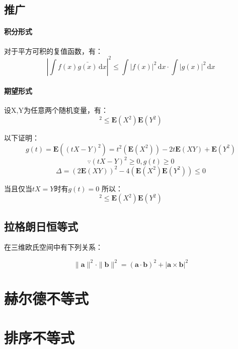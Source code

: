 \documentclass[a4paper]{article} %
\numberwithin{equation}{section} %
\newcommand{\ud}{\,\mathrm{d}}
\begin{document}
\subsection{推广}
\paragraph{积分形式}
对于平方可积的复值函数，有：
$$
\left|\int f(x)\bar{g(x)}\ud x\right|^2\le \int |f(x)|^2\ud x\cdot\int |g(x)|^2\ud x
$$

\paragraph{期望形式}
设X,Y为任意两个随机变量，有：
\begin{equation}
[\mathbf E(XY)]^2\le \mathbf E(X^2)\mathbf E(Y^2)
\end{equation}

以下证明：
\begin{equation}
g(t)= \mathbf E((tX-Y)^2)=t^2(\mathbf E(X^2))-2t\mathbf E(XY)+\mathbf E(Y^2)
\end{equation}
\begin{equation}
\because (tX-Y)^2\ge 0,g(t)\ge 0
\end{equation}
\begin{equation}
\Delta=(2\mathbf E(XY))^2-4(\mathbf E(X^2)\mathbf E(Y^2))\le 0
\end{equation}

当且仅当$tX=Y$时有$g(t)=0$
所以：
\begin{equation}
[\mathbf E(XY)]^2\le \mathbf E(X^2)\mathbf E(Y^2)
\end{equation}

\subsection{拉格朗日恒等式}
在三维欧氏空间中有下列关系：

\begin{equation}
\|{\mathbf  a}\|^{2}\cdot \|{\mathbf  b}\|^{2}=({\mathbf  {a\cdot b}})^{2}+|\mathbf a\times\mathbf  b|^2
\end{equation}

\section{赫尔德不等式}


\section{排序不等式}
\end{document}

